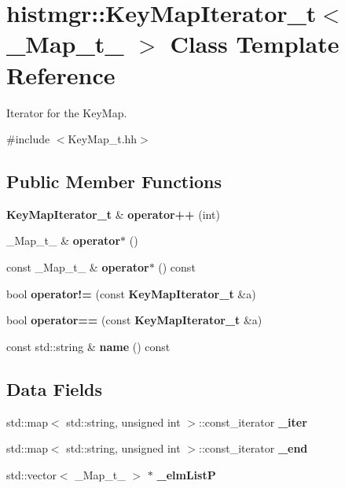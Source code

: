 \section{histmgr::KeyMapIterator\_\-t$<$ \_\-Map\_\-t\_\- $>$ Class Template Reference}
\label{classhistmgr_1_1KeyMapIterator__t}


Iterator for the KeyMap.  


{\ttfamily \#include $<$KeyMap\_\-t.hh$>$}\subsection*{Public Member Functions}
\begin{DoxyCompactItemize}
\item 
{\bf KeyMapIterator\_\-t} \& {\bfseries operator++} (int)\label{classhistmgr_1_1KeyMapIterator__t_a8dcf109b5967c4c11f0e52d4aef777f3}

\item 
\_\-Map\_\-t\_\- \& {\bfseries operator$\ast$} ()\label{classhistmgr_1_1KeyMapIterator__t_a33664e3b5550d2fdd286f1669efa7d10}

\item 
const \_\-Map\_\-t\_\- \& {\bfseries operator$\ast$} () const \label{classhistmgr_1_1KeyMapIterator__t_af5a8d583bcf26ff7866df066d200598e}

\item 
bool {\bfseries operator!=} (const {\bf KeyMapIterator\_\-t} \&a)\label{classhistmgr_1_1KeyMapIterator__t_ae02f2c50b69107f3eb9b31a9828560f8}

\item 
bool {\bfseries operator==} (const {\bf KeyMapIterator\_\-t} \&a)\label{classhistmgr_1_1KeyMapIterator__t_aef04b811fd364003d920e2af59ef58f2}

\item 
const std::string \& {\bfseries name} () const \label{classhistmgr_1_1KeyMapIterator__t_ad4fc569584ae74eeed57ad051f243e9a}

\end{DoxyCompactItemize}
\subsection*{Data Fields}
\begin{DoxyCompactItemize}
\item 
std::map$<$ std::string, unsigned int $>$::const\_\-iterator {\bfseries \_\-iter}\label{classhistmgr_1_1KeyMapIterator__t_aa41ef843e1366530672421aa495ba594}

\item 
std::map$<$ std::string, unsigned int $>$::const\_\-iterator {\bfseries \_\-end}\label{classhistmgr_1_1KeyMapIterator__t_a219ddf2712319da91557d603dc2e1a4d}

\item 
std::vector$<$ \_\-Map\_\-t\_\- $>$ $\ast$ {\bfseries \_\-elmListP}\label{classhistmgr_1_1KeyMapIterator__t_a7ab18ad834c26291af97185dd417d07a}

\end{DoxyCompactItemize}
